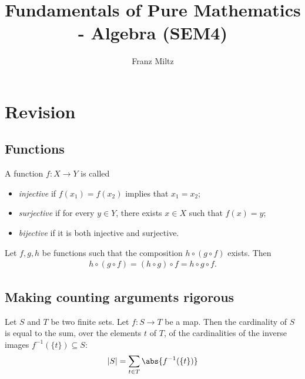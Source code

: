 \documentclass{article}
\begin{document}
\mkfpmthms
\title{Fundamentals of Pure Mathematics - Algebra (SEM4)}
\author{Franz Miltz}
\maketitle
\tableofcontents
\pagebreak

\setcounter{section}{-1}


\section{Revision}


\subsection{Functions}

\begin{definition}
    A function $f:X\to Y$ is called
    \begin{itemize}
        \item \emph{injective} if $f(x_1)=f(x_2)$ implies that $x_1=x_2$;
        \item \emph{surjective} if for every $y\in Y$, there exists $x\in X$ such that $f(x)=y$;
        \item \emph{bijective} if it is both injective and surjective.
    \end{itemize}
\end{definition}

\begin{lemma}
    Let $f,g,h$ be functions such that the composition $h \circ (g \circ f)$ exists. Then
    \begin{align*}
        h \circ (g \circ f) = (h \circ g) \circ f = h \circ g \circ f.
    \end{align*}
\end{lemma}

\subsection{Making counting arguments rigorous}

\begin{theorem}
    Let $S$ and $T$ be two finite sets. Let $f:S\to T$ be a map.
    Then the cardinality of $S$ is equal to the sum, over the elements
    $t$ of $T$, of the cardinalities of the inverse images $f^{-1}(\{t\})\subseteq S$:
    \begin{align*}
        |S| = \sum_{t\in T}\abs{f^{-1}(\{t\})}
    \end{align*}
\end{theorem}
\end{document}
